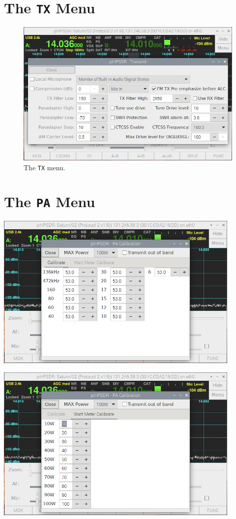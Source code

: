 \documentclass[12pt]{book}
\def\bltt#1{\texttt{\color{blue}#1}}
\begin{document}
\section{The \texttt{TX} Menu}
\begin{figure}[h]
\center
\includegraphics[width=12cm]{TXMenu.png}
\caption{The \bltt{TX} menu.}
\label{fig:TXMenu}
\end{figure}

\section{The \texttt{PA} Menu}
\begin{center}
\includegraphics[width=12cm]{PAMenuCalibrate.png}
\end{center}

\begin{center}
\includegraphics[width=12cm]{PAMenuWatt.png}
\end{center}
\end{document}
